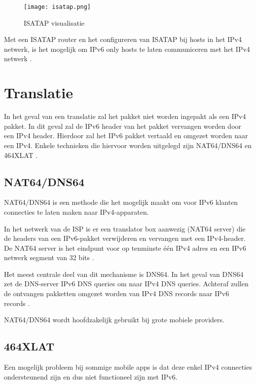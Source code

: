 \begin{figure}
  \texttt{[image: isatap.png]}
  \centering
  \caption{ISATAP visualisatie \autocite{RIPE2016}}
  \centering
\end{figure}

Met een ISATAP router en het configureren van ISATAP bij hosts in het IPv4 netwerk, is het mogelijk om IPv6 only hosts te laten communiceren met het IPv4 netwerk \autocite{RIPE2016}.

\section{Translatie}

In het geval van een translatie zal het pakket niet worden ingepakt als een IPv4 pakket. In dit geval zal de IPv6 header van het pakket vervangen worden door een IPv4 header. Hierdoor zal het IPv6 pakket vertaald en omgezet worden naar een IPv4. Enkele technieken die hiervoor worden uitgelegd zijn  NAT64/DNS64 en 464XLAT \autocite{RIPE2016}.

\subsection{NAT64/DNS64}

NAT64/DNS64 is een methode die het mogelijk maakt om voor IPv6 klanten connecties te laten maken naar IPv4-apparaten.

In het netwerk van de ISP is er een translator box aanwezig (NAT64 server) die de headers van een IPv6-pakket verwijderen en vervangen met een IPv4-header. De NAT64 server is het eindpunt voor op tenminste één IPv4 adres en een IPv6 netwerk segment van 32 bits \autocite{RIPE2016}.

Het meest centrale deel van dit mechanisme is DNS64. In het geval van DNS64 zet de DNS-server IPv6 DNS queries om naar IPv4 DNS queries. Achteraf zullen de ontvangen pakketten omgezet worden van IPv4 DNS records naar IPv6 records \autocite{RIPE2016}.

NAT64/DNS64 wordt hoofdzakelijk gebruikt bij grote mobiele providers.

\subsection{464XLAT}

Een mogelijk probleem bij sommige mobile apps is dat deze enkel IPv4 connecties ondersteunend zijn en dus niet functioneel zijn met IPv6.

